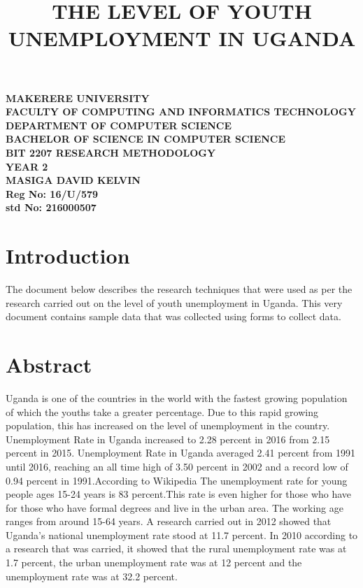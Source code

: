 \documentclass[a4paper,12pt]{article}
\begin{document}
\begin{Huge}
\begin{center}
\begin{normalsize}

\textbf{MAKERERE UNIVERSITY } \\
\textbf{FACULTY OF COMPUTING AND INFORMATICS TECHNOLOGY} \\
\textbf{DEPARTMENT OF COMPUTER SCIENCE} \\
\textbf{BACHELOR OF SCIENCE IN COMPUTER SCIENCE} \\
\textbf{BIT 2207 RESEARCH METHODOLOGY} \\
\textbf{YEAR 2} \\


\textbf{\sc MASIGA DAVID KELVIN } \\
\textbf{\sc Reg No: 16/U/579 } \\
\textbf{\sc std No: 216000507}\\
\end{normalsize}
\end{center}
\end{Huge}
\newpage

\title{THE LEVEL OF YOUTH UNEMPLOYMENT IN UGANDA}
\maketitle    
\section{Introduction}
The document below describes the research techniques that were used as per the research carried out on the level of youth unemployment in Uganda. This very document contains sample data that was collected using forms to collect data.  
\section{Abstract}                                                                                                                                                                                    Uganda is one of the countries in the world with the fastest growing population of which the youths take a greater percentage. Due to this rapid growing population, this has increased on the level of unemployment in the country.
Unemployment Rate in Uganda increased to 2.28 percent in 2016 from 2.15 percent in 2015. Unemployment Rate in Uganda averaged 2.41 percent from 1991 until 2016, reaching an all time high of 3.50 percent in 2002 and a record low of 0.94 percent in 1991.According to Wikipedia The unemployment rate for young people ages 15-24 years is 83 percent.This rate is even higher for those who have for those who have formal degrees and live in the urban area.	 
The working age ranges from around 15-64 years. A research carried out in 2012 showed that Uganda's national unemployment rate stood at 11.7 percent. In 2010 according to a research that was carried, it showed that the rural unemployment rate was at 1.7 percent, the urban unemployment rate was at 12 percent and the unemployment rate was at 32.2 percent.
\end{document}
